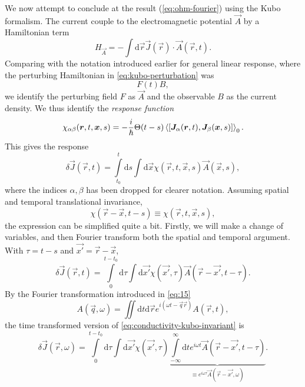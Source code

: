 We now attempt to conclude at the result (\ref{eq:ohm-fourier}) using the Kubo formalism.
The current couple to the electromagnetic potential $\vec{A}$ by a Hamiltonian term
\begin{equation}
  \label{eq:electromagnetic-coupling}
  H_{\vec{A}} = -\int \mathrm{d}\vec{r}
  \vec{J}(\vec{r}) \cdot \vec{A}(\vec{r}, t).
\end{equation}
Comparing with the notation introduced earlier for general linear response, where the perturbing Hamiltonian in \cref{eq:kubo-perturbation} was
\[
F(t) {B},
\]
we identify the perturbing field $F$ as $\vec{A}$ and the observable ${B}$ as the current density.
We thus identify the \emph{response function}
\begin{equation}
  \chi_{\alpha\beta}(\vec{r}, t, \vec{x}, s) = - \frac{i}{\hbar} 
  \Theta(t-s)
  \Braket{
    \left[
      \vec{J}_{\alpha}(\vec{r}, t), \vec{J}_{\beta}(\vec{x}, s)
    \right]
  }_{0}.
\end{equation}
This gives the response
\begin{equation}
  \label{eq:conductivity-kubo}
  \delta  \vec{J}(\vec{r}, t) =
  \int\limits_{t_0}^{t} \! \mathrm{d}s
  \int \mathrm{d}\vec{x}
  \chi(\vec{r}, t, \vec{x}, s)
  \vec{A}(\vec{x}, s),
\end{equation}
where the indices $\alpha, \beta$ has been dropped for clearer notation.
Assuming spatial and temporal translational invariance,
\begin{equation}
  \label{eq:response_trans_invariant}
  \chi(\vec{r}-\vec{x}, t-s) \equiv \chi(\vec{r}, t, \vec{x}, s),
\end{equation}
the expression can be simplified quite a bit.
Firstly, we will make a change of variables, and then Fourier transform both the spatial and temporal argument.
With $\tau = t-s$ and $\vec{x'} = \vec{r} - \vec{x}$,
\begin{equation}
  \label{eq:conductivity-kubo-invariant}
  \delta \vec{J}(\vec{r}, t) =
  \int\limits_0^{t-t_0} \mathrm{d}\tau
  \int \mathrm{d}\vec{x'}
  \chi(\vec{x'}, \tau)
  \vec{A}(\vec{r} - \vec{x'}, t-\tau).
\end{equation}
By the Fourier transformation introduced in \cref{eq:15}
\[
  A(\vec{q}, \omega ) =
  \iint \mathrm{d}t \mathrm{d} \vec{r}
  e^{i(\omega  t - \vec{q} \vec{r} )}
  A(\vec{r}, t),
\]
the time transformed version of \cref{eq:conductivity-kubo-invariant} is 
\begin{equation}
  \delta \vec{J}(\vec{r}, \omega) = 
  \int\limits_0^{t-t_0} \! \mathrm{d}\tau
  \int \mathrm{d}\vec{x'}
  \chi(\vec{x'}, \tau)
  \underbrace{
    \int\limits_{-\infty}^{\infty} \mathrm{d}t
    e^{i \omega t}
    \vec{A}(\vec{r} - \vec{x'}, t-\tau)
    }_{\equiv e^{i\omega \tau} \vec{A}(\vec{r} - \vec{x'}, \omega)}.
\end{equation}
